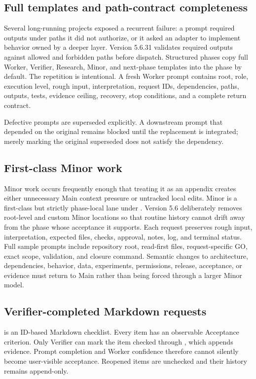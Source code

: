 \documentclass[11pt,a4paper]{article}
\newcommand{\code}[1]{\texttt{\detokenize{#1}}}
\begin{document}
\subsection{Full templates and path-contract completeness}

Several long-running projects exposed a recurrent failure: a prompt required outputs under paths it
did not authorize, or it asked an adapter to implement behavior owned by a deeper layer. Version
5.6.31 validates required outputs against allowed and forbidden paths before dispatch. Structured
phases copy full Worker, Verifier, Research, Minor, and next-phase templates into the phase by
default. The repetition is intentional. A fresh Worker prompt contains root, role, execution level,
rough input, interpretation, request IDs, dependencies, paths, outputs, tests, evidence ceiling,
recovery, stop conditions, and a complete return contract.

Defective prompts are superseded explicitly. A downstream prompt that depended on the original
remains blocked until the replacement is integrated; merely marking the original superseded does
not satisfy the dependency.

\subsection{First-class Minor work}

Minor work occurs frequently enough that treating it as an appendix creates either unnecessary Main
context pressure or untracked local edits. Minor is a first-class but strictly phase-local lane under
. Version 5.6 deliberately removes root-level and custom Minor
locations so that routine history cannot drift away from the phase whose acceptance it supports. Each request preserves rough input, interpretation, expected files, checks,
approval, notes, log, and terminal status. Full sample prompts include repository root, read-first
files, request-specific GO, exact scope, validation, and closure command. Semantic changes to
architecture, dependencies, behavior, data, experiments, permissions, release, acceptance, or
evidence must return to Main rather than being forced through a larger Minor model.

\subsection{Verifier-completed Markdown requests}

\code{REQUESTS.md} is an ID-based Markdown checklist. Every item has an observable Acceptance
criterion. Only Verifier can mark the item checked through \code{aw request verify}, which appends
evidence. Prompt completion and Worker confidence therefore cannot silently become user-visible
acceptance. Reopened items are unchecked and their history remains append-only.
\end{document}
